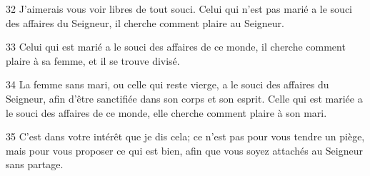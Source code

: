 
32 J’aimerais vous voir libres de tout souci. Celui qui n’est pas marié a le souci des affaires du Seigneur, il cherche comment plaire au Seigneur.

33 Celui qui est marié a le souci des affaires de ce monde, il cherche comment plaire à sa femme, et il se trouve divisé.

34 La femme sans mari, ou celle qui reste vierge, a le souci des affaires du Seigneur, afin d’être sanctifiée dans son corps et son esprit. Celle qui est mariée a le souci des affaires de ce monde, elle cherche comment plaire à son mari.

35 C’est dans votre intérêt que je dis cela; ce n’est pas pour vous tendre un piège, mais pour vous proposer ce qui est bien, afin que vous soyez attachés au Seigneur sans partage.

